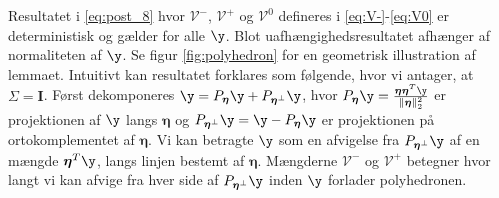 Resultatet i \eqref{eq:post_8} hvor \(\mathcal{V}^-\), \(\mathcal{V}^+\) og \(\mathcal{V}^0\) defineres i \eqref{eq:V-}-\eqref{eq:V0} er deterministisk og gælder for alle \(\y\).
Blot uafhængighedsresultatet afhænger af normaliteten af \(\y\).
Se figur \ref{fig:polyhedron} for en geometrisk illustration af lemmaet.
Intuitivt kan resultatet forklares som følgende, hvor vi antager, at \(\Sigma= \mathbf{I}\).
Først dekomponeres \(\y=P_{\boldsymbol{\eta}} \y + P_{\boldsymbol{\eta}^\perp} \y\), hvor \(P_{\boldsymbol{\eta}} \y = \frac{\boldsymbol{\eta} \boldsymbol{\eta}^T \y}{\Vert \boldsymbol{\eta} \Vert_2^2}\) er projektionen af \(\y\) langs \(\boldsymbol{\eta}\) og  \(P_{\boldsymbol{\eta}^\perp} \y = \y - P_{\boldsymbol{\eta}} \y\) er projektionen på ortokomplementet af \(\boldsymbol{\eta}\).
Vi kan betragte \(\y\) som en afvigelse fra \(P_{\boldsymbol{\eta}^\perp} \y\) af en mængde \(\boldsymbol{\eta}^T \y\), langs linjen bestemt af \(\boldsymbol{\eta}\).
Mængderne \(\mathcal{V}^-\) og \(\mathcal{V}^+\) betegner hvor langt vi kan afvige fra hver side af \(P_{\boldsymbol{\eta}^\perp} \y\) inden \(\y\) forlader polyhedronen.
